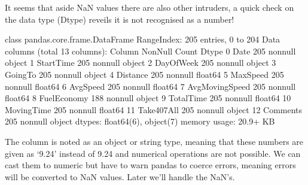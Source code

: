 \documentclass[letterpaper,10pt,english]{jupyterBook}
\begin{document}
\sphinxAtStartPar
It seems that aside NaN values there are also other intruders, a quick check on the data type (Dtype) reveils it is not recognised as a number!

\begin{sphinxVerbatim}[commandchars=\\\{\}]
\end{sphinxVerbatim}

\begin{sphinxVerbatim}[commandchars=\\\{\}]
\PYGZlt{}class \PYGZsq{}pandas.core.frame.DataFrame\PYGZsq{}\PYGZgt{}
RangeIndex: 205 entries, 0 to 204
Data columns (total 13 columns):
 \PYGZsh{}   Column          Non\PYGZhy{}Null Count  Dtype  
\PYGZhy{}\PYGZhy{}\PYGZhy{}  \PYGZhy{}\PYGZhy{}\PYGZhy{}\PYGZhy{}\PYGZhy{}\PYGZhy{}          \PYGZhy{}\PYGZhy{}\PYGZhy{}\PYGZhy{}\PYGZhy{}\PYGZhy{}\PYGZhy{}\PYGZhy{}\PYGZhy{}\PYGZhy{}\PYGZhy{}\PYGZhy{}\PYGZhy{}\PYGZhy{}  \PYGZhy{}\PYGZhy{}\PYGZhy{}\PYGZhy{}\PYGZhy{}  
 0   Date            205 non\PYGZhy{}null    object 
 1   StartTime       205 non\PYGZhy{}null    object 
 2   DayOfWeek       205 non\PYGZhy{}null    object 
 3   GoingTo         205 non\PYGZhy{}null    object 
 4   Distance        205 non\PYGZhy{}null    float64
 5   MaxSpeed        205 non\PYGZhy{}null    float64
 6   AvgSpeed        205 non\PYGZhy{}null    float64
 7   AvgMovingSpeed  205 non\PYGZhy{}null    float64
 8   FuelEconomy     188 non\PYGZhy{}null    object 
 9   TotalTime       205 non\PYGZhy{}null    float64
 10  MovingTime      205 non\PYGZhy{}null    float64
 11  Take407All      205 non\PYGZhy{}null    object 
 12  Comments        205 non\PYGZhy{}null    object 
dtypes: float64(6), object(7)
memory usage: 20.9+ KB
\end{sphinxVerbatim}

\sphinxAtStartPar
The column is noted as an object or string type, meaning that these numbers are given as ‘9.24’ instead of 9.24 and numerical operations are not possible.
We can cast them to numeric but have to warn pandas to coerce errors, meaning errors will be converted to NaN values.
Later we’ll handle the NaN’s.

\begin{sphinxVerbatim}[commandchars=\\\{\}]
   
\end{sphinxVerbatim}
\end{document}
